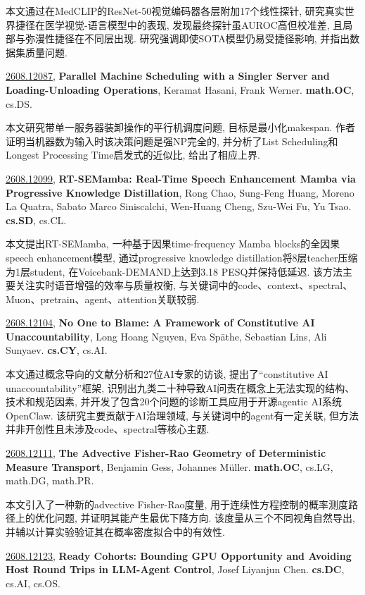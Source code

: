 \documentclass[9pt, a4paper]{article}
\theoremstyle{plain}
\theoremstyle{definition}
\theoremstyle{remark}
\newcommand{\arxivwithtarget}[3]{\hypertarget{#1}{}\href{https://arxiv.org/abs/#1}{#1}, \textbf{\textcolor{arxivblue}{#2}}, #3. }
\begin{document}
本文通过在MedCLIP的ResNet-50视觉编码器各层附加17个线性探针, 研究真实世界捷径在医学视觉-语言模型中的表现, 发现最终探针虽AUROC高但校准差, 且局部与弥漫性捷径在不同层出现. 研究强调即使SOTA模型仍易受捷径影响, 并指出数据集质量问题.


\arxivwithtarget{2608.12087}{Parallel Machine Scheduling with a Singler Server and Loading-Unloading Operations}{Keramat Hasani, Frank Werner}\textbf{math.OC}, cs.DS.

本文研究带单一服务器装卸操作的平行机调度问题, 目标是最小化makespan. 作者证明当机器数为输入时该决策问题是强NP完全的, 并分析了List Scheduling和Longest Processing Time启发式的近似比, 给出了相应上界.


\arxivwithtarget{2608.12099}{RT-SEMamba: Real-Time Speech Enhancement Mamba via Progressive Knowledge Distillation}{Rong Chao, Sung-Feng Huang, Moreno La Quatra, Sabato Marco Siniscalchi, Wen-Huang Cheng, Szu-Wei Fu, Yu Tsao}\textbf{cs.SD}, cs.CL.

本文提出RT-SEMamba, 一种基于因果time-frequency Mamba blocks的全因果speech enhancement模型, 通过progressive knowledge distillation将8层teacher压缩为1层student, 在Voicebank-DEMAND上达到3.18 PESQ并保持低延迟. 该方法主要关注实时语音增强的效率与质量权衡, 与关键词中的code、context、spectral、Muon、pretrain、agent、attention关联较弱.


\arxivwithtarget{2608.12104}{No One to Blame: A Framework of Constitutive AI Unaccountability}{Long Hoang Nguyen, Eva Späthe, Sebastian Lins, Ali Sunyaev}\textbf{cs.CY}, cs.AI.

本文通过概念导向的文献分析和27位AI专家的访谈, 提出了“constitutive AI unaccountability”框架, 识别出九类二十种导致AI问责在概念上无法实现的结构、技术和规范因素, 并开发了包含20个问题的诊断工具应用于开源agentic AI系统OpenClaw. 该研究主要贡献于AI治理领域, 与关键词中的agent有一定关联, 但方法并非开创性且未涉及code、spectral等核心主题.


\arxivwithtarget{2608.12111}{The Advective Fisher-Rao Geometry of Deterministic Measure Transport}{Benjamin Gess, Johannes Müller}\textbf{math.OC}, cs.LG, math.DG, math.PR.

本文引入了一种新的advective Fisher-Rao度量, 用于连续性方程控制的概率测度路径上的优化问题, 并证明其能产生最优下降方向. 该度量从三个不同视角自然导出, 并辅以计算实验验证其在概率密度拟合中的有效性.


\arxivwithtarget{2608.12123}{Ready Cohorts: Bounding GPU Opportunity and Avoiding Host Round Trips in LLM-Agent Control}{Josef Liyanjun Chen}\textbf{cs.DC}, cs.AI, cs.OS.
\end{document}
